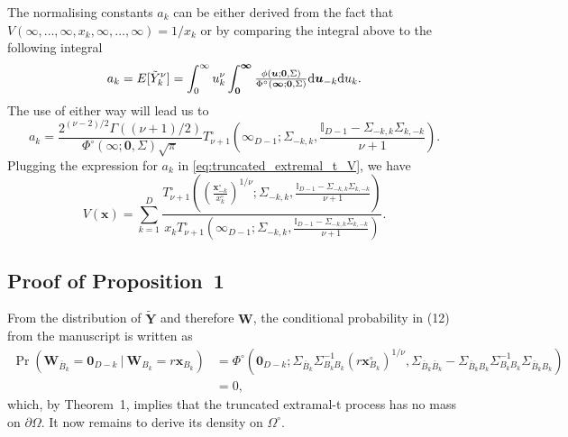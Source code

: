 \documentclass[lineno]{biometrika}
\begin{document}
The normalising constants $a_k$ can be either derived from the fact that $V(\infty,\dots,\infty,x_k,\infty,\dots,\infty) = 1/x_k$ or by comparing the integral above to the following integral 
\begin{equation*}
\label{eq:normalising_trunc}
a_k = E[\tilde Y_k^\nu] = \int_0^\infty u_k^\nu \int_{\bm 0}^{\bm \infty} {\textstyle{\phi(\bm u; \bm 0,\Sigma)\over\Phi^\circ(\bm \infty;\bm 0, \Sigma)}}\text d \bm u_{-k}\text d u_k.	
\end{equation*}
The use of either way will lead us to 
\begin{equation*}
\label{eq:truncate_extremal_t_a}
a_k =\frac{2^{(\nu-2)/2}\Gamma((\nu+1)/2)}{\Phi^\circ(\bm \infty;\bm 0, \Sigma)\sqrt{\pi}} T_{\nu+1}^\circ\left(
\bm \infty_{D-1}
;\Sigma_{-k,k},\frac{\mathbb{I}_{D-1}-\Sigma_{-k,k}\Sigma_{k,-k}}{\nu+1}\right).
\end{equation*}
Plugging the expression for $a_k$ in \eqref{eq:truncated_extremal_t_V}, we have 
\begin{equation*}
V(\bm x) = \sum_{k=1}^D \frac{T_{\nu+1}^\circ\left( \left(\frac{\bm x_{-k}^\circ}{x_k^\circ}\right)^{1/\nu} ;\Sigma_{-k,k},\frac{\mathbb{I}_{D-1}-\Sigma_{-k,k}\Sigma_{k,-k}}{\nu+1}\right)}{x_k T_{\nu+1}^\circ\left(\bm \infty_{D-1};\Sigma_{-k,k},\frac{\mathbb{I}_{D-1}-\Sigma_{-k,k}\Sigma_{k,-k}}{\nu+1}\right)}.	
\end{equation*}

\subsection{Proof of Proposition~1}

From the distribution of $\tilde{\bm Y}$ and therefore $\bm W$, the conditional probability in (12) from the manuscript is written as
%
\begin{align*}
\Pr(\bm W_{\bar{B}_k} = \bm 0_{D-k} \ | \ \bm W_{B_k} = r \bm x_{B_k} )
& = \Phi^\circ \left( \bm 0_{D-k};
\Sigma_{\bar{B}_k}\Sigma_{B_k B_k}^{-1} \left(r \bm x_{B_k}^\circ\right)^{1/\nu},\Sigma_{\bar{B}_k\bar{B}_k}-\Sigma_{\bar{B}_k B_k}\Sigma_{B_k B_k}^{-1}\Sigma_{\bar{B}_k B_k} \right) \\
& = 0,
\end{align*}
%
which, by Theorem~1, implies that the truncated extramal-t process has no mass on $\partial\Omega$. It now remains to derive its density on $\Omega^\circ$. 
\end{document}
